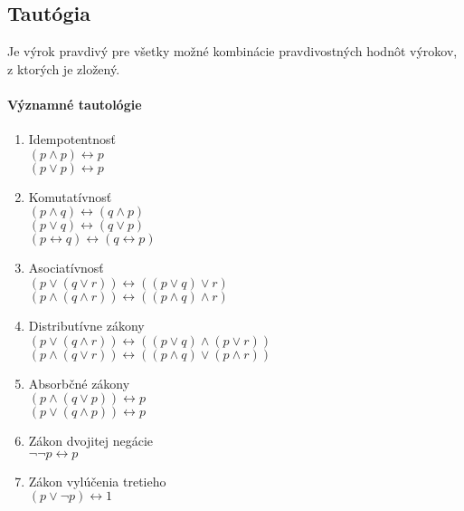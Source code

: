   \subsection*{Tautógia} 
  Je výrok pravdivý pre všetky možné kombinácie pravdivostných hodnôt výrokov, z ktorých je zložený.


    \paragraph{Významné tautológie}
	\begin{enumerate}
    \item Idempotentnosť\\
    $( p \wedge p) \leftrightarrow  p $\\
    $( p \vee p) \leftrightarrow  p $\\
    \item Komutatívnosť\\
    $( p \wedge q) \leftrightarrow  ( q \wedge p)$\\
    $( p \vee q) \leftrightarrow  ( q \vee p)$ \\
    $( p \leftrightarrow  q) \leftrightarrow  ( q \leftrightarrow  p)$ \\
    \item Asociatívnosť \\
    $( p \vee ( q \vee r)) \leftrightarrow  (( p \vee q) \vee r)$\\
    $( p \wedge ( q \wedge r)) \leftrightarrow  (( p \wedge q) \wedge r)$\\
    \item Distributívne zákony \\
    $( p \vee ( q \wedge r)) \leftrightarrow  (( p \vee q) \wedge ( p \vee r))$\\
    $( p \wedge ( q \vee r)) \leftrightarrow  (( p \wedge q) \vee ( p \wedge r))$\\
    \item Absorbčné zákony\\
    $( p \wedge ( q \vee p)) \leftrightarrow  p$\\
    $( p \vee ( q \wedge p)) \leftrightarrow  p$\\
    \item Zákon dvojitej negácie\\
   	$\neg \neg  p \leftrightarrow  p$\\
    \item Zákon vylúčenia tretieho\\
    $( p \vee \neg  p) \leftrightarrow 1$\\

\end{enumerate}
